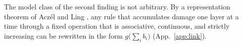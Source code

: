 The model class of the second finding is not arbitrary. By a representation theorem of Acz\'el and Ling
\citep{aczel1966fe,ling1965assoc}, any rule that accumulates damage one layer at a time through a fixed
operation that is associative, continuous, and strictly increasing can be rewritten in the form
$g\bigl(\sum_i b_i\bigr)$ (App.~\ref{app:link}). 



